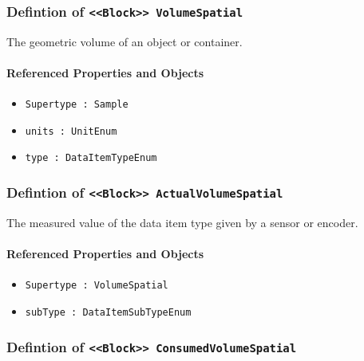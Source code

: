 \subsubsection{Defintion of \texttt{<<Block>> VolumeSpatial}}
  \label{type:VolumeSpatial}

\FloatBarrier

The geometric volume of an object or container.

\FloatBarrier
\paragraph{Referenced Properties and Objects}

\begin{itemize}
\item \texttt{Supertype : Sample}

\item \texttt{units : UnitEnum}

\item \texttt{type : DataItemTypeEnum}

\end{itemize}
\FloatBarrier
\subsubsection{Defintion of \texttt{<<Block>> ActualVolumeSpatial}}
  \label{type:ActualVolumeSpatial}

\FloatBarrier

The measured value of the data item type given by a sensor or encoder.

\FloatBarrier
\paragraph{Referenced Properties and Objects}

\begin{itemize}
\item \texttt{Supertype : VolumeSpatial}

\item \texttt{subType : DataItemSubTypeEnum}

\end{itemize}
\FloatBarrier
\subsubsection{Defintion of \texttt{<<Block>> ConsumedVolumeSpatial}}
  \label{type:ConsumedVolumeSpatial}

\FloatBarrier


